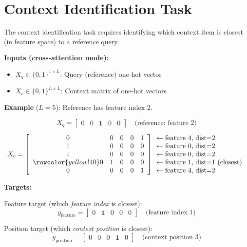 \documentclass[12pt]{article}
\begin{document}

\section*{Context Identification Task}

The context identification task requires identifying which context item is closest (in feature space) to a reference query.

\textbf{Inputs (cross-attention mode):}
\begin{itemize}
    \item $X_q \in \{0,1\}^{1 \times L}$: Query (reference) one-hot vector
    \item $X_c \in \{0,1\}^{L \times L}$: Context matrix of one-hot vectors
\end{itemize}

\vspace{1em}
\textbf{Example} ($L=5$): Reference has feature index 2.

\[
X_q = \begin{bmatrix} 0 & 0 & \mathbf{1} & 0 & 0 \end{bmatrix}
\quad \text{(reference: feature 2)}
\]

\[
X_c = \left[
\begin{array}{ccccc}
0 & 0 & 0 & 0 & 1 \\
1 & 0 & 0 & 0 & 0 \\
1 & 0 & 0 & 0 & 0 \\
\rowcolor{yellow!40} 0 & 1 & 0 & 0 & 0 \\
0 & 0 & 0 & 0 & 1 \\
\end{array}
\right]
\begin{array}{l}
\leftarrow \text{feature 4, dist=2} \\
\leftarrow \text{feature 0, dist=2} \\
\leftarrow \text{feature 0, dist=2} \\
\leftarrow \text{feature 1, dist=1 (closest)} \\
\leftarrow \text{feature 4, dist=2} \\
\end{array}
\]

\vspace{1em}
\textbf{Targets:}

\vspace{0.5em}
Feature target (which \emph{feature index} is closest):
\[
y_{\text{feature}} = \begin{bmatrix} 0 & \mathbf{1} & 0 & 0 & 0 \end{bmatrix}
\quad \text{(feature index 1)}
\]

Position target (which \emph{context position} is closest):
\[
y_{\text{position}} = \begin{bmatrix} 0 & 0 & 0 & \mathbf{1} & 0 \end{bmatrix}
\quad \text{(context position 3)}
\]
\end{document}
